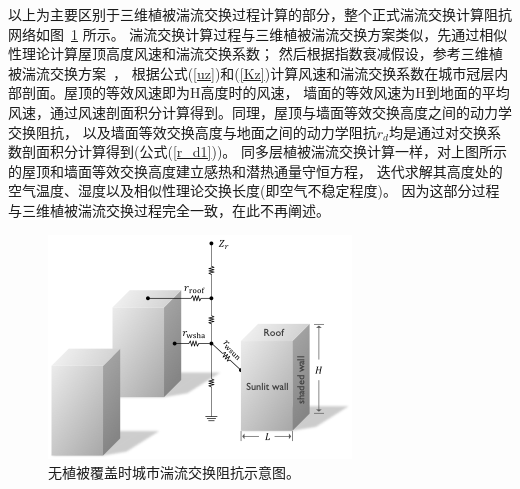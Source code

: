 以上为主要区别于三维植被湍流交换过程计算的部分，整个正式湍流交换计算阻抗网络如图~\ref{fig:无植被覆盖时城市湍流交换阻抗示意图} 所示。
湍流交换计算过程与三维植被湍流交换方案类似，先通过相似性理论计算屋顶高度风速和湍流交换系数；
然后根据指数衰减假设，参考三维植被湍流交换方案~\citep{dai2019different}，
根据公式(\ref{uz})和(\ref{Kz})计算风速和湍流交换系数在城市冠层内部剖面。屋顶的等效风速即为H高度时的风速，
墙面的等效风速为H到地面的平均风速，通过风速剖面积分计算得到。同理，屋顶与墙面等效交换高度之间的动力学交换阻抗，
以及墙面等效交换高度与地面之间的动力学阻抗$r_d$均是通过对交换系数剖面积分计算得到(公式(\ref{r_d1}))。
同多层植被湍流交换计算一样，对上图所示的屋顶和墙面等效交换高度建立感热和潜热通量守恒方程，
迭代求解其高度处的空气温度、湿度以及相似性理论交换长度(即空气不稳定程度)。
因为这部分过程与三维植被湍流交换过程完全一致，在此不再阐述。
{
\begin{figure}[]
\centering
\includegraphics{Figures/城市模式/无植被覆盖时城市湍流交换阻抗示意图.png}
\caption{无植被覆盖时城市湍流交换阻抗示意图。}
\label{fig:无植被覆盖时城市湍流交换阻抗示意图}
\end{figure}
}



